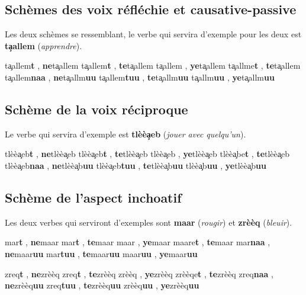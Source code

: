 \subsection{Schèmes des voix réfléchie et causative-passive}
Les deux schèmes se ressemblant, le verbe qui servira d'exemple pour les deux est \textbf{t\c{a}allem} (\textit{apprendre}).

    {t\c{a}allem\textbf{t} , \textbf{ne}t\c{a}allem}
    {t\c{a}allem\textbf{t} , \textbf{te}t\c{a}allem} 
    {t\c{a}allem , \textbf{ye}t\c{a}allem}
    {t\c{a}allme\textbf{t} , \textbf{te}t\c{a}allem}
    {t\c{a}allem\textbf{naa} , \textbf{ne}t\c{a}allm\textbf{uu}}
    {t\c{a}allem\textbf{tuu} , \textbf{te}t\c{a}allm\textbf{uu}}
    {t\c{a}allm\textbf{uu} , \textbf{ye}t\c{a}allm\textbf{uu}} 

\subsection{Schème de la voix réciproque}
Le verbe qui servira d'exemple est \textbf{tlèè\c{a}eb} (\textit{jouer avec quelqu'un}).

 {tlèè\c{a}eb\textbf{t} , \textbf{ne}tlèè\c{a}eb}
 {tlèè\c{a}eb\textbf{t} , \textbf{te}tlèè\c{a}eb} 
 {tlèè\c{a}eb , \textbf{ye}tlèè\c{a}eb}
 {tlèè\c{a}be\textbf{t} , \textbf{te}tlèè\c{a}eb}
 {tlèè\c{a}eb\textbf{naa} , \textbf{ne}tlèè\c{a}b\textbf{uu}}
 {tlèè\c{a}eb\textbf{tuu} , \textbf{te}tlèè\c{a}b\textbf{uu}} 
 {tlèè\c{a}b\textbf{uu} , \textbf{ye}tlèè\c{a}b\textbf{uu}} 

\subsection{Schème de l'aspect inchoatif}
Les deux verbes qui serviront d'exemples sont \textbf{\textcrh maar} (\textit{rougir}) et \textbf{zrèèq} (\textit{bleuir}).

    {\textcrh mar\textbf{t} , \textbf{ne}\textcrh maar}
    {\textcrh mar\textbf{t} , \textbf{te}\textcrh maar} 
    {\textcrh maar , \textbf{ye}\textcrh maar}
    {\textcrh maare\textbf{t} , \textbf{te}\textcrh maar}
    {\textcrh mar\textbf{naa} , \textbf{ne}\textcrh maar\textbf{uu}}
    {\textcrh mar\textbf{tuu} , \textbf{te}\textcrh maar\textbf{uu}} 
    {\textcrh maar\textbf{uu} , \textbf{ye}\textcrh maar\textbf{uu}} 

    {zreq\textbf{t} , \textbf{ne}zrèèq}
    {zreq\textbf{t} , \textbf{te}zrèèq} 
    {zrèèq , \textbf{ye}zrèèq}
    {zrèèqe\textbf{t} , \textbf{te}zrèèq}
    {zreq\textbf{naa} , \textbf{ne}zrèèq\textbf{uu}}
    {zreq\textbf{tuu} , \textbf{te}zrèèq\textbf{uu}} 
    {zrèèq\textbf{uu} , \textbf{ye}zrèèq\textbf{uu}} 

